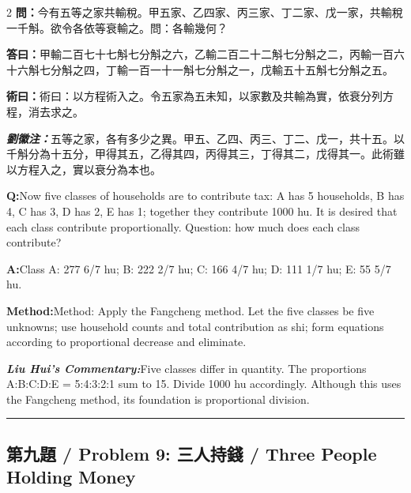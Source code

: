 \documentclass[11pt,a4paper]{article}
\newcommand{\cnwen}{\textcolor{cnlabelfg}{\textbf{問：}}}
\newcommand{\cnda}{\textbf{答曰：}}
\newcommand{\cnshu}{\textcolor{cnlabelfg}{\textbf{術曰：}}}
\newcommand{\cnzhu}{\textcolor{commentarycolor}{\textit{\textbf{劉徽注：}}}}
\newcommand{\enwen}{\textcolor{enlabelfg}{\textbf{Q:}}}
\newcommand{\enda}{\textcolor{enlabelfg}{\textbf{A:}}}
\newcommand{\enshu}{\textcolor{enlabelfg}{\textbf{Method:}}}
\newcommand{\enzhu}{\textcolor{enlabelfg}{\textit{\textbf{Liu Hui's Commentary:}}}}
\begin{document}
\begin{paracol}{2}
\switchcolumn[0]
\cnwen 今有五等之家共輸稅。甲五家、乙四家、丙三家、丁二家、戊一家，共輸稅一千斛。欲令各依等衰輸之。問：各輸幾何？

\cnda 甲輸二百七十七斛七分斛之六，乙輸二百二十二斛七分斛之二，丙輸一百六十六斛七分斛之四，丁輸一百一十一斛七分斛之一，戊輸五十五斛七分斛之五。

\cnshu 術曰：以方程術入之。令五家為五未知，以家數及共輸為實，依衰分列方程，消去求之。

\cnzhu 五等之家，各有多少之異。甲五、乙四、丙三、丁二、戊一，共十五。以千斛分為十五分，甲得其五，乙得其四，丙得其三，丁得其二，戊得其一。此術雖以方程入之，實以衰分為本也。

\switchcolumn[1]
\enwen Now five classes of households are to contribute tax: A has 5 households, B has 4, C has 3, D has 2, E has 1; together they contribute 1000 hu. It is desired that each class contribute proportionally. Question: how much does each class contribute?

\enda Class A: 277 6/7 hu; B: 222 2/7 hu; C: 166 4/7 hu; D: 111 1/7 hu; E: 55 5/7 hu.

\enshu Method: Apply the Fangcheng method. Let the five classes be five unknowns; use household counts and total contribution as shi; form equations according to proportional decrease and eliminate.

\enzhu Five classes differ in quantity. The proportions A:B:C:D:E = 5:4:3:2:1 sum to 15. Divide 1000 hu accordingly. Although this uses the Fangcheng method, its foundation is proportional division.
\end{paracol}

\bigskip\hrule\bigskip

\subsection{第九題 / Problem 9: 三人持錢 / Three People Holding Money}
\end{document}
